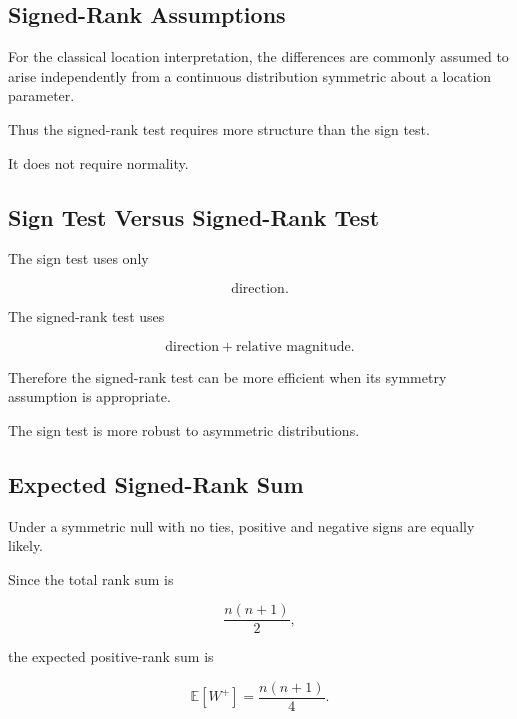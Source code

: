 \subsection{Signed-Rank Assumptions}
\label{subsec:signed-rank-assumptions}

For the classical location interpretation, the differences are commonly
assumed to arise independently from a continuous distribution symmetric
about a location parameter.

Thus the signed-rank test requires more structure than the sign test.

It does not require normality.

\subsection{Sign Test Versus Signed-Rank Test}
\label{subsec:sign-versus-signed-rank}

The sign test uses only

\[
\boxed{
\text{direction}.
}
\]

The signed-rank test uses

\[
\boxed{
\text{direction}
+
\text{relative magnitude}.
}
\]

Therefore the signed-rank test can be more efficient when its symmetry
assumption is appropriate.

The sign test is more robust to asymmetric distributions.

\subsection{Expected Signed-Rank Sum}
\label{subsec:expected-signed-rank}

Under a symmetric null with no ties, positive and negative signs are
equally likely.

Since the total rank sum is

\[
\frac{
n(n+1)
}{2},
\]

the expected positive-rank sum is

\[
\boxed{
\mathbb{E}[W^+]
=
\frac{
n(n+1)
}{4}.
}
\]

